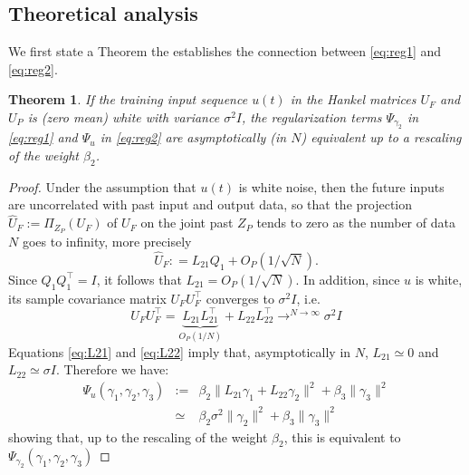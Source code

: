 \documentclass[letterpaper, 10 pt, conference]{ieeeconf}  %
\newtheorem{thm}{Theorem}
\begin{document}
\subsection{Theoretical analysis}
We first state a Theorem the establishes the connection between \eqref{eq:reg1} and \eqref{eq:reg2}.

\begin{thm}\label{thm:reg}
	If the training input sequence $u(t)$ in the Hankel matrices $U_F$ and $U_P$ is (zero mean) white with variance $\sigma^2 I$, the regularization terms $\Psi_{\gamma_2}$ in \eqref{eq:reg1} and $\Psi_{u}$ in \eqref{eq:reg2} are asymptotically (in $N$) equivalent up to a rescaling of the weight $\beta_2$.
\end{thm}
\begin{proof}
	Under the assumption that $u(t)$ is white noise, then the future inputs are uncorrelated with past input and output data, so that the projection $\hat U_F:=\Pi_{Z_{P}}(U_F)$ of $U_F$ on the joint past $Z_P$ tends to zero as the number of data $N$ goes to infinity, more precisely
	\begin{equation}\label{eq:L21}
		\hat U_F: = L_{21}Q_1 + O_P(1/\sqrt{N}).
	\end{equation}
	Since $Q_1Q_1^\top = I$, it follows that $L_{21} = O_P(1/\sqrt{N})$. In addition, since $u$ is white, its sample covariance matrix $U_FU_F^\top$ converges to $\sigma^2 I$, i.e. 
	\begin{equation}\label{eq:L22}
		U_FU_F^\top = \underbrace{L_{21}L_{21}^\top}_{O_P(1/{N})} + L_{22}L_{22}^\top \mathop{\longrightarrow}^{N \rightarrow\infty} \sigma^2  I
	\end{equation}
	Equations \eqref{eq:L21} and \eqref{eq:L22} imply that, asymptotically in $N$, $L_{21}\simeq 0$ and $L_{22}\simeq \sigma I$. Therefore we have:
	\begin{equation}\label{eq:reg2eqreg1}
		\begin{array}{rcl}
			\Psi_u(\gamma_1,\gamma_2,\gamma_3) &:=&  \beta_2\|L_{21} \gamma_1 + L_{22} \gamma_2\|^2 + \beta_3 \|\gamma_3\|^2\\
			& \simeq & \beta_2 \sigma^2\|\gamma_2\|^2 + \beta_3 \|\gamma_3\|^2
		\end{array}
	\end{equation}
	showing that, up to the rescaling of the weight $\beta_2$, this is equivalent to $\Psi_{\gamma_2}(\gamma_1,\gamma_2,\gamma_3) $
\end{proof}
\end{document}
